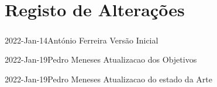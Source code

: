 \chapter*{Registo de Alterações}
\paragraph{}

\begin{logentry}{2022-Jan-14}{António Ferreira}
Versão Inicial
\end{logentry}

\begin{logentry}{2022-Jan-19}{Pedro Meneses}
Atualizacao dos Objetivos
\end{logentry}

\begin{logentry}{2022-Jan-19}{Pedro Meneses}
Atualizacao do estado da Arte
\end{logentry}